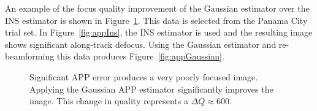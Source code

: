 \documentclass[conference]{IEEEtran}
\begin{document}
An example of the focus quality improvement of the Gaussian estimator over the INS estimator is shown in Figure~\ref{fig:imageComp}. This data is selected from the Panama City trial set. In Figure~\ref{fig:appIns}, the INS estimator is used and the resulting image shows significant along-track defocus. Using the Gaussian estimator and re-beamforming this data produces Figure~\ref{fig:appGaussian}.
%
\begin{figure}[ht]
  \centering
  \hfill
  \hfill
  \hfill
  \caption{Significant APP error produces a very poorly focused image. Applying the Gaussian APP estimator significantly improves the image. This change in quality represents a $\Delta Q \approx 600$.} \label{fig:imageComp}
\end{figure}
\end{document}
